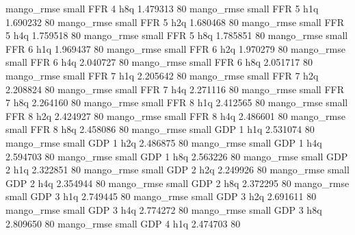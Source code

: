        mango_rmse      small      FFR                 4                  h8q 1.479313 80
       mango_rmse      small      FFR                 5                  h1q 1.690232 80
       mango_rmse      small      FFR                 5                  h2q 1.680468 80
       mango_rmse      small      FFR                 5                  h4q 1.759518 80
       mango_rmse      small      FFR                 5                  h8q 1.785851 80
       mango_rmse      small      FFR                 6                  h1q 1.969437 80
       mango_rmse      small      FFR                 6                  h2q 1.970279 80
       mango_rmse      small      FFR                 6                  h4q 2.040727 80
       mango_rmse      small      FFR                 6                  h8q 2.051717 80
       mango_rmse      small      FFR                 7                  h1q 2.205642 80
       mango_rmse      small      FFR                 7                  h2q 2.208824 80
       mango_rmse      small      FFR                 7                  h4q 2.271116 80
       mango_rmse      small      FFR                 7                  h8q 2.264160 80
       mango_rmse      small      FFR                 8                  h1q 2.412565 80
       mango_rmse      small      FFR                 8                  h2q 2.424927 80
       mango_rmse      small      FFR                 8                  h4q 2.486601 80
       mango_rmse      small      FFR                 8                  h8q 2.458086 80
       mango_rmse      small      GDP                 1                  h1q 2.531074 80
       mango_rmse      small      GDP                 1                  h2q 2.486875 80
       mango_rmse      small      GDP                 1                  h4q 2.594703 80
       mango_rmse      small      GDP                 1                  h8q 2.563226 80
       mango_rmse      small      GDP                 2                  h1q 2.322851 80
       mango_rmse      small      GDP                 2                  h2q 2.249926 80
       mango_rmse      small      GDP                 2                  h4q 2.354944 80
       mango_rmse      small      GDP                 2                  h8q 2.372295 80
       mango_rmse      small      GDP                 3                  h1q 2.749445 80
       mango_rmse      small      GDP                 3                  h2q 2.691611 80
       mango_rmse      small      GDP                 3                  h4q 2.774272 80
       mango_rmse      small      GDP                 3                  h8q 2.809650 80
       mango_rmse      small      GDP                 4                  h1q 2.474703 80
